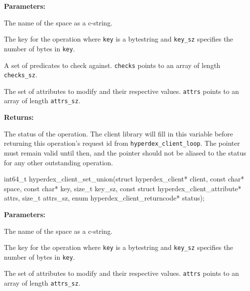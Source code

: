 \noindent\textbf{Parameters:}
\begin{description}[labelindent=\widthof{{\texttt{checks}, \texttt{checks\_sz}}},leftmargin=*,noitemsep,nolistsep,align=right]
\item[\texttt{space}] The name of the space as a c-string.
\item[\texttt{key}, \texttt{key\_sz}] The key for the operation where \texttt{key} is a bytestring and \texttt{key\_sz} specifies the number of bytes in \texttt{key}.
\item[\texttt{checks}, \texttt{checks\_sz}] A set of predicates to check against.  \texttt{checks} points to an array of length \texttt{checks\_sz}.
\item[\texttt{attrs}, \texttt{attrs\_sz}] The set of attributes to modify and their respective values.  \texttt{attrs} points to an array of length \texttt{attrs\_sz}.
\end{description}

\noindent\textbf{Returns:}
\begin{description}[labelindent=\widthof{{\texttt{status}}},leftmargin=*,noitemsep,nolistsep,align=right]
\item[\texttt{status}] The status of the operation.  The client library will fill in this variable before returning this operation's request id from \texttt{hyperdex\_client\_loop}.  The pointer must remain valid until then, and the pointer should not be aliased to the status for any other outstanding operation.
\end{description}

\funcsep
{}
\begin{ccode}
int64_t hyperdex_client_set_union(struct hyperdex_client* client,
                const char* space,
                const char* key, size_t key_sz,
                const struct hyperdex_client_attribute* attrs, size_t attrs_sz,
                enum hyperdex_client_returncode* status);
\end{ccode}
\funcdesc 

\noindent\textbf{Parameters:}
\begin{description}[labelindent=\widthof{{\texttt{attrs}, \texttt{attrs\_sz}}},leftmargin=*,noitemsep,nolistsep,align=right]
\item[\texttt{space}] The name of the space as a c-string.
\item[\texttt{key}, \texttt{key\_sz}] The key for the operation where \texttt{key} is a bytestring and \texttt{key\_sz} specifies the number of bytes in \texttt{key}.
\item[\texttt{attrs}, \texttt{attrs\_sz}] The set of attributes to modify and their respective values.  \texttt{attrs} points to an array of length \texttt{attrs\_sz}.
\end{description}

